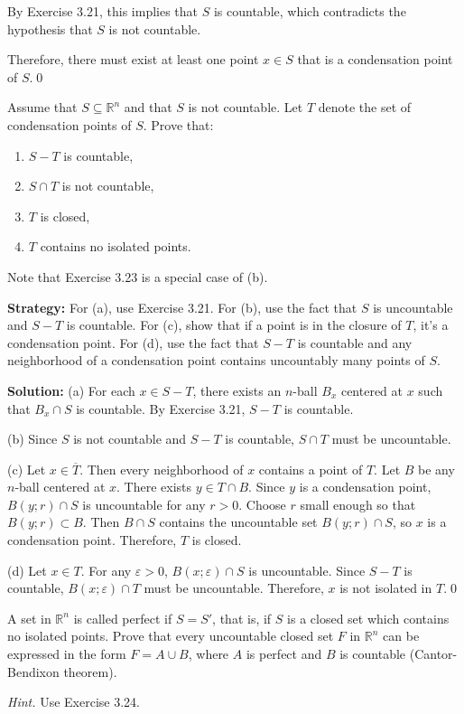 By Exercise 3.21, this implies that $S$ is countable, which contradicts the hypothesis that $S$ is not countable.

Therefore, there must exist at least one point $x \in S$ that is a condensation point of $S$.\qed


\begin{problembox}
Assume that \( S \subseteq \mathbb{R}^n \) and that \( S \) is not countable. Let \( T \) denote the set of condensation points of \( S \). Prove that:
\begin{enumerate}[label=\alph*)]
\item \( S - T \) is countable,
\item \( S \cap T \) is not countable,
\item \( T \) is closed,
\item \( T \) contains no isolated points.
\end{enumerate}
Note that Exercise 3.23 is a special case of (b).
\end{problembox}

\noindent\textbf{Strategy:} For (a), use Exercise 3.21. For (b), use the fact that $S$ is uncountable and $S-T$ is countable. For (c), show that if a point is in the closure of $T$, it's a condensation point. For (d), use the fact that $S-T$ is countable and any neighborhood of a condensation point contains uncountably many points of $S$.

\bigskip\noindent\textbf{Solution:} 
(a) For each $x \in S - T$, there exists an $n$-ball $B_x$ centered at $x$ such that $B_x \cap S$ is countable. By Exercise 3.21, $S - T$ is countable.

(b) Since $S$ is not countable and $S - T$ is countable, $S \cap T$ must be uncountable.

(c) Let $x \in \overline{T}$. Then every neighborhood of $x$ contains a point of $T$. Let $B$ be any $n$-ball centered at $x$. There exists $y \in T \cap B$. Since $y$ is a condensation point, $B(y;r) \cap S$ is uncountable for any $r > 0$. Choose $r$ small enough so that $B(y;r) \subset B$. Then $B \cap S$ contains the uncountable set $B(y;r) \cap S$, so $x$ is a condensation point. Therefore, $T$ is closed.

(d) Let $x \in T$. For any $\varepsilon > 0$, $B(x;\varepsilon) \cap S$ is uncountable. Since $S - T$ is countable, $B(x;\varepsilon) \cap T$ must be uncountable. Therefore, $x$ is not isolated in $T$.\qed


\begin{problembox}
A set in \( \mathbb{R}^n \) is called perfect if \( S = S' \), that is, if \( S \) is a closed set which contains no isolated points. Prove that every uncountable closed set \( F \) in \( \mathbb{R}^n \) can be expressed in the form \( F = A \cup B \), where \( A \) is perfect and \( B \) is countable (Cantor-Bendixon theorem).

\textit{Hint.} Use Exercise 3.24.
\end{problembox}

